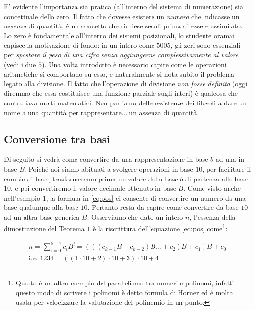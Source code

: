 {E' evidente l'importanza sia pratica (all'interno
del sistema di numerazione) sia concettuale dello zero. Il fatto che dovesse
esistere un \emph{numero} che indicasse un \emph{assenza} di quantità, è un
concetto che richiese secoli prima di essere assimilato. Lo zero è fondamentale
all'interno dei sistemi posizionali, lo studente oramai capisce la motivazione
di fondo: in un intero come $5005$, gli zeri sono essenziali per \emph{spostare
il peso di una cifra senza aggiungerne complessivamente al valore} (vedi i due
$5$). Una volta introdotto è necessario capire come le operazioni aritmetiche
si comportano su esso, e naturalmente si nota subito il problema legato alla
divisione. Il fatto che l'operazione di divisione \emph{non fosse definita}
(oggi diremmo che essa costituisce una funzione parziale sugli interi) è
qualcosa che contrariava molti matematici. Non parliamo delle resistenze dei
filosofi a dare un nome a una quantità per rappresentare....un assenza di
quantità.
}

\subsection{Conversione tra basi}\label{sec:conversione}

Di seguito si vedrà come convertire da una rappresentazione in base $b$ ad una
in base $B$. Poiché noi siamo abituati a svolgere operazioni in base $10$, per
facilitare il cambio di base, trasformeremo prima un valore dalla base $b$ di
partenza alla base $10$, e poi convertiremo il valore decimale ottenuto in base
$B$. Come visto anche nell'esempio $1$, la formula in \eqref{eq:pos} ci
consente di convertire un numero da una base qualunque alla base $10$. Pertanto
resta da capire come convertire da base $10$ ad un altra base generica $B$.
Osserviamo che dato un intero $n$, l'essenza della dimostrazione del Teorema
$1$ è la riscrittura dell'equazione \eqref{eq:pos} come\footnote{Questo è un
altro esempio del parallelismo tra numeri e polinomi, infatti questo modo di
scrivere i polinomi è detto formula di Horner ed è molto usata per velocizzare
la valutazione del polinomio in un punto.}:

\begin{align*}
n = \sum_{i=0}^{k-1} c_iB^i = (((c_{k-1}B+c_{k-2})B\ldots+ c_2)B + c_1)B + c_0\\
\text{i.e. } 1234 = ((1\cdot{10}+2)\cdot{10}+3)\cdot{10} + 4
\end{align*}


